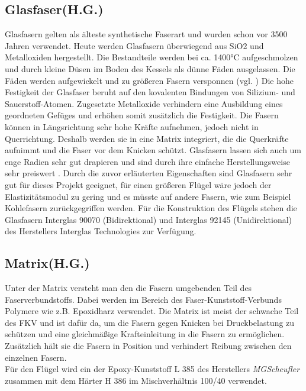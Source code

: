 \subsection{Glasfaser(H.G.)}
\label{Glasfaser}
Glasfasern gelten als älteste synthetische Faserart und wurden schon vor 3500 Jahren verwendet. Heute werden Glasfasern überwiegend aus SiO2 und Metalloxiden hergestellt. Die Bestandteile werden bei ca. 1400°C aufgeschmolzen und durch kleine Düsen im Boden des Kessels als dünne Fäden ausgelassen. Die Fäden werden aufgewickelt und zu größeren Fasern versponnen (vgl. \cite{item3})
Die hohe Festigkeit der Glasfaser beruht auf den kovalenten Bindungen von Silizium- und Sauerstoff-Atomen. Zugesetzte Metalloxide verhindern eine Ausbildung eines geordneten Gefüges und erhöhen somit zusätzlich die Festigkeit. Die Fasern können in Längsrichtung sehr hohe Kräfte aufnehmen, jedoch nicht in Querrichtung. Deshalb werden sie in eine Matrix integriert, die die Querkräfte aufnimmt und die Faser vor dem Knicken schützt. Glasfasern lassen sich auch um enge Radien sehr gut drapieren und sind durch ihre einfache Herstellungsweise sehr preiswert \cite{item4}.
Durch die zuvor erläuterten Eigenschaften sind Glasfasern sehr gut für dieses Projekt geeignet, für einen größeren Flügel wäre jedoch der Elastizitätsmodul zu gering und es müsste auf andere Fasern, wie zum Beispiel Kohlefasern zurückgegriffen werden. 
Für die Konstruktion des Flügels stehen die Glasfasern Interglas 90070 (Bidirektional) und Interglas 92145 (Unidirektional) des Herstellers Interglas Technologies zur Verfügung. 

\subsection{Matrix(H.G.)}
Unter der Matrix versteht man den die Fasern umgebenden Teil des Faserverbundstoffs. Dabei werden im Bereich des Faser-Kunststoff-Verbunds Polymere wie z.B. Epoxidharz verwendet. Die Matrix ist meist der schwache Teil des FKV und ist dafür da, um die Fasern gegen Knicken bei Druckbelastung zu schützen und eine gleichmäßige Krafteinleitung in die Fasern zu ermöglichen. Zusätzlich hält sie die Fasern in Position und verhindert Reibung zwischen den einzelnen Fasern.\cite{item3}\\
Für den Flügel wird ein der Epoxy-Kunststoff L 385 des Herstellers \textit{MGScheufler} zusammen mit dem Härter H 386 im Mischverhältnis 100/40 verwendet.
